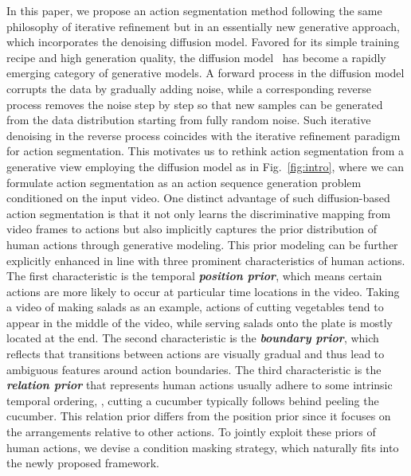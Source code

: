 \documentclass[10pt,twocolumn,letterpaper]{article}
\begin{document}
In this paper, we propose an action segmentation method following the same philosophy of iterative refinement but in an essentially new generative approach, which incorporates the denoising diffusion model. 
Favored for its simple training recipe and high generation quality, the diffusion model~\cite{DiffusionSurvey,DDIM,BeatsGAN,DDPM} has become a rapidly emerging category of generative models.
A forward process in the diffusion model corrupts the data by gradually adding noise, while a corresponding reverse process removes the noise step by step so that new samples can be generated from the data distribution starting from fully random noise.
Such iterative denoising in the reverse process coincides with the iterative refinement paradigm for action segmentation.
This motivates us to rethink action segmentation from a generative view employing the diffusion model as in Fig.~\ref{fig:intro}, where we can formulate action segmentation as an action sequence generation problem conditioned on the input video.
One distinct advantage of such diffusion-based action segmentation is that it not only learns the discriminative mapping from video frames to actions but also implicitly captures the prior distribution of human actions through generative modeling.
This prior modeling can be further explicitly enhanced in line with three prominent characteristics of human actions.
The first characteristic is the temporal \textbf{\textit{position prior}}, which means certain actions are more likely to occur at particular time locations in the video. Taking a video of making salads as an example, actions of cutting vegetables tend to appear in the middle of the video, while serving salads onto the plate is mostly located at the end.
The second characteristic is the \textbf{\textit{boundary prior}}, which reflects that transitions between actions are visually gradual and thus lead to ambiguous features around action boundaries.
The third characteristic is the \textbf{\textit{relation prior}} that represents human actions usually adhere to some intrinsic temporal ordering, \eg, cutting a cucumber typically follows behind peeling the cucumber.
This relation prior differs from the position prior since it focuses on the arrangements relative to other actions.
To jointly exploit these priors of human actions, we devise a condition masking strategy, which naturally fits into the newly proposed framework.
\end{document}
